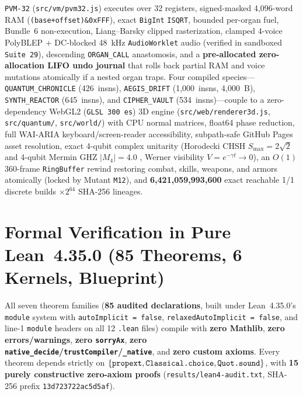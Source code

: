 \documentclass[11pt,letterpaper]{article}
\theoremstyle{remark}
\begin{document}
\texttt{PVM-32} (\texttt{src/vm/pvm32.js}) executes over 32 registers, signed-masked 4,096-word RAM (\texttt{(base+\allowbreak offset)\allowbreak\&0xFFF}), exact \texttt{BigInt} \texttt{ISQRT}, bounded per-organ fuel, Bundle~6 non-execution, Liang--Barsky clipped rasterization, clamped 4-voice PolyBLEP + DC-blocked 48~kHz \texttt{Audio\allowbreak Worklet} audio (verified in sandboxed \texttt{Suite 29}), descending \texttt{ORGAN\_\allowbreak CALL} anastomosis, and a \textbf{pre-allocated zero-allocation LIFO undo journal} that rolls back partial RAM and voice mutations atomically if a nested organ traps. Four compiled species---\texttt{QUANTUM\_\allowbreak CHRONICLE} (426~insns), \texttt{AEGIS\_\allowbreak DRIFT} (1,000~insns, 4,000~B), \texttt{SYNTH\_\allowbreak REACTOR} (645~insns), and \texttt{CIPHER\_\allowbreak VAULT} (534~insns)---couple to a zero-dependency WebGL2 (\texttt{GLSL 300 es}) 3D engine (\texttt{src/web/\allowbreak renderer3d.js}, \texttt{src/quantum/}, \texttt{src/world/}) with CPU normal matrices, float64 phase reduction, full WAI-ARIA keyboard/screen-reader accessibility, subpath-safe GitHub Pages asset resolution, exact 4-qubit complex unitarity (Horodecki CHSH $S_{\max}=2\sqrt{2}$ \cite{horodecki1995} and 4-qubit Mermin GHZ $|M_4|=4.0$ \cite{mermin1990}, Werner visibility $V=e^{-\gamma t}\to 0$), an $O(1)$ 360-frame \texttt{Ring\allowbreak Buffer} rewind restoring combat, skills, weapons, and armors atomically (locked by Mutant \texttt{M12}), and \textbf{6,421,059,993,600} exact reachable 1/1 discrete builds $\times 2^{64}$ SHA-256 lineages.

\section{Formal Verification in Pure Lean~4.35.0 (85 Theorems, 6 Kernels, Blueprint)}
\label{sec:lean}

All seven theorem families (\textbf{85 audited declarations}, built under Lean~4.35.0's \texttt{module} system \cite{demoura2021} with \texttt{autoImplicit = false}, \texttt{relaxedAutoImplicit = false}, and line-1 \texttt{module} headers on all 12 \texttt{.lean} files) compile with \textbf{zero Mathlib}, \textbf{zero errors/warnings}, \textbf{zero \texttt{sorryAx}}, \textbf{zero \texttt{native\_\allowbreak decide}/\allowbreak\texttt{trustCompiler}/\allowbreak\texttt{\_native}}, and \textbf{zero custom axioms}. Every theorem depends strictly on $\{\texttt{propext},\allowbreak \texttt{Classical.\allowbreak choice},\allowbreak \texttt{Quot.\allowbreak sound}\}$, with \textbf{15 purely constructive zero-axiom proofs} (\texttt{results/\allowbreak lean4-audit.txt}, SHA-256 prefix \texttt{13d723722ac5d5af}).
\end{document}
